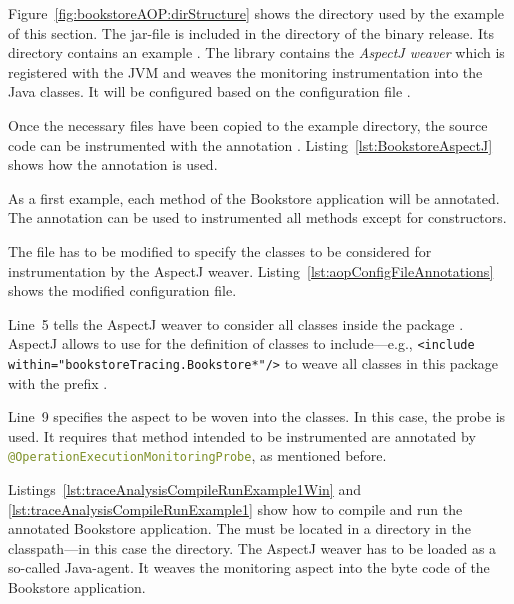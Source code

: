 Figure~\ref{fig:bookstoreAOP:dirStructure} shows the directory used by the %
example of this section. %
The jar-file  is included in the %
 directory of the \Kieker{} binary release. Its %
 directory contains an example \file{\aopConfigFile}. %
The library  contains the \textit{AspectJ weaver} %
which is registered with the JVM and weaves the monitoring instrumentation into %
the Java classes. It will be configured based on the configuration file %
\file{\file{\aopConfigFile}}.

Once the necessary files have been copied to the example directory,
the source code can be instrumented with the annotation %
. %
Listing~\ref{lst:BookstoreAspectJ} shows how the annotation is used.

\setJavaCodeListing


\noindent As a first example, each method of the Bookstore application will be %
annotated. The annotation can be used to instrumented all methods %
except for constructors. %

The \file{\aopConfigFile} file has to be modified to specify the classes to %
be considered for instrumentation by the AspectJ weaver. %
Listing~\ref{lst:aopConfigFileAnnotations} shows the modified configuration file.

\setXMLListing


\noindent Line~5 tells the AspectJ weaver to consider all classes inside the package %
. AspectJ allows to use for the definition of classes to %
include---e.g., \lstinline$<include within="bookstoreTracing.Bookstore*"/>$ to weave all %
classes in this package with the prefix . 

Line~9 specifies the aspect to be woven into the classes. In this case, the \Kieker{} %
probe  is used. It requires that %
method intended to be instrumented are annotated by %
\lstinline[language=Java]{@OperationExecutionMonitoringProbe}, as mentioned before. 

Listings~\ref{lst:traceAnalysisCompileRunExample1Win} and %
\ref{lst:traceAnalysisCompileRunExample1} show how to compile and run the annotated %
Bookstore application. The \file{\aopConfigFile} must be located in a %
 directory in the classpath---in this case the  directory. %
The AspectJ weaver has to be loaded as a so-called Java-agent. It weaves the %
monitoring aspect into the byte code of the Bookstore application.

